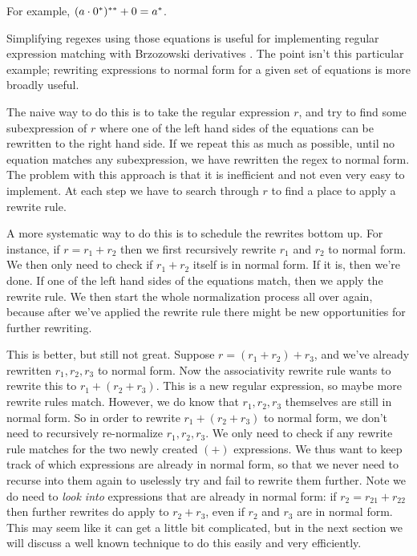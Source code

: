 For example, $(a \cdot 0^*)^{**} + 0 = a^*$.

Simplifying regexes using those equations is useful for implementing regular expression matching with Brzozowski derivatives \cite{brzozowski64,owens_reppy_turon_2009}.
The point isn't this particular example; rewriting expressions to normal form for a given set of equations is more broadly useful.

The naive way to do this is to take the regular expression $r$, and try to find some subexpression of $r$ where one of the left hand sides of the equations can be rewritten to the right hand side.
If we repeat this as much as possible, until no equation matches any subexpression, we have rewritten the regex to normal form.
The problem with this approach is that it is inefficient and not even very easy to implement. At each step we have to search through $r$ to find a place to apply a rewrite rule.

A more systematic way to do this is to schedule the rewrites bottom up. For instance, if $r = r_1 + r_2$ then we first recursively rewrite $r_1$ and $r_2$ to normal form. We then only need to check if $r_1 + r_2$ itself is in normal form. If it is, then we're done. If one of the left hand sides of the equations match, then we apply the rewrite rule. We then start the whole normalization process all over again, because after we've applied the rewrite rule there might be new opportunities for further rewriting.

This is better, but still not great. Suppose $r = (r_1 + r_2) + r_3$, and we've already rewritten $r_1,r_2,r_3$ to normal form. Now the associativity rewrite rule wants to rewrite this to $r_1 + (r_2 + r_3)$. This is a new regular expression, so maybe more rewrite rules match. However, we do know that $r_1, r_2, r_3$ themselves are still in normal form. So in order to rewrite $r_1 + (r_2 + r_3)$ to normal form, we don't need to recursively re-normalize $r_1, r_2, r_3$. We only need to check if any rewrite rule matches for the two newly created $(+)$ expressions. We thus want to keep track of which expressions are already in normal form, so that we never need to recurse into them again to uselessly try and fail to rewrite them further. Note we do need to \emph{look into} expressions that are already in normal form: if $r_2 = r_{21} + r_{22}$ then further rewrites do apply to $r_2 + r_3$, even if $r_2$ and $r_3$ are in normal form. This may seem like it can get a little bit complicated, but in the next section we will discuss a well known technique to do this easily and very efficiently.



